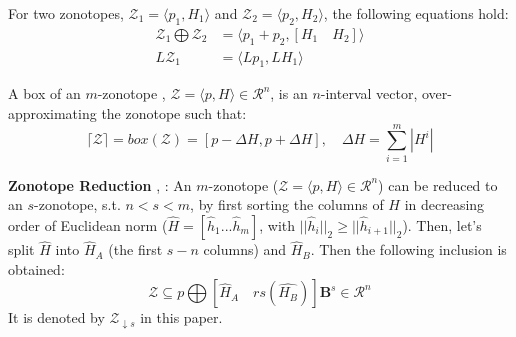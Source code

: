 \begin{lemma}
For two zonotopes, $\mathcal{Z}_1 = \langle p_1, H_1 \rangle$ and $\mathcal{Z}_2 = \langle p_2, H_2 \rangle$, the following equations hold:
\begin{equation}
\begin{split}
\mathcal{Z}_1 \bigoplus \mathcal{Z}_2 &= \langle p_1+p_2, [H_1 \quad H_2]\rangle \\
L\mathcal{Z}_1 &= \langle Lp_1, LH_1 \rangle 
\end{split}
\end{equation}
\end{lemma}
\begin{lemma} \cite{Althoff2010} \label{prop:overapprox}
A box of an $m$-zonotope , $\mathcal{Z} = \langle p, H \rangle \in \mathcal{R}^n$, is an $n$-interval vector, over-approximating the zonotope such that:
\begin{equation}
\lceil \mathcal{Z} \rceil = box(\mathcal{Z}) = [ p - \Delta H , p+ \Delta H], \quad \Delta H = \sum^{m}_{i=1} |H^i| 
\end{equation}
\end{lemma}
\begin{lemma}
\textbf{Zonotope Reduction} \cite{Alamo2005}, \cite{Combastel2003}: An $m$-zonotope ($\mathcal{Z} = \langle p, H \rangle \in \mathcal{R}^n$) can be reduced to an $s$-zonotope, s.t. $n < s < m$, by first sorting the columns of $H$ in decreasing order of Euclidean norm ($\hat{H}= [\hat{h}_1 ... \hat{h}_m]$, with $||\hat{h}_i||_2 \geq  ||\hat{h}_{i+1}||_2$). Then, let's split $\hat{H}$ into $\hat{H}_A$ (the first $s-n$ columns) and $\hat{H}_B$. Then the following inclusion is obtained:
\begin{equation}
\mathcal{Z} \subseteq p \bigoplus [\hat{H}_A \quad rs(\hat{H_B})]\textbf{B}^s \in \mathcal{R}^n
\end{equation}
It is denoted by $\mathcal{Z}_{\downarrow s}$ in this paper.
\end{lemma}

